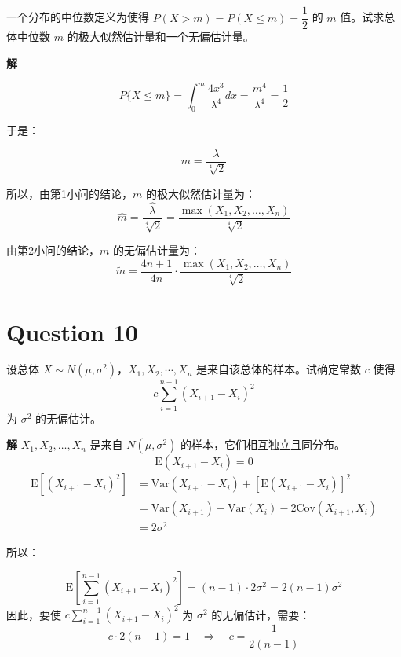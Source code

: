 \documentclass[12pt,a4paper]{article}
\begin{document}
\subsection{}
一个分布的中位数定义为使得 $P(X>m)=P(X\le m)=\dfrac{1}{2}$ 的 $m$ 值。试求总体中位数 $m$ 的极大似然估计量和一个无偏估计量。

\begin{answerbox}
\textbf{解}  

  $$
  P\{X \leq m\} = \int_0^m \frac{4x^3}{\lambda^4} dx = \frac{m^4}{\lambda^4} = \frac{1}{2}
  $$

  于是：

  $$
  m = \frac{\lambda}{\sqrt[4]{2}} 
  $$

  所以，由第1小问的结论，$m$ 的极大似然估计量为：
  $$\hat{m} = \frac{\hat{\lambda}}{\sqrt[4]{2}} = \frac{\max(X_1, X_2, \ldots, X_n)}{\sqrt[4]{2}}$$

  由第2小问的结论，$m$ 的无偏估计量为：
  $$
  \tilde{m} = \frac{4n+1}{4n} \cdot \frac{\max(X_1, X_2, \ldots, X_n)}{\sqrt[4]{2}}
  $$
\end{answerbox}

\section{Question 10}

设总体 $X\sim N(\mu,\sigma^2)$，$X_1,X_2,\cdots,X_n$ 是来自该总体的样本。试确定常数 $c$ 使得
\[
    c\sum_{i=1}^{n-1}(X_{i+1}-X_i)^2
\]
为 $\sigma^2$ 的无偏估计。

\begin{answerbox}
\textbf{解}  
  $X_1, X_2, \ldots, X_n$ 是来自 $N(\mu, \sigma^2)$ 的样本，它们相互独立且同分布。
  $$
  \mathrm{E}(X_{i+1}-X_i) = 0
  $$
  $$
  \begin{aligned}
  \mathrm{E}[(X_{i+1}-X_i)^2] &= \mathrm{Var}(X_{i+1}-X_i) + [\mathrm{E}(X_{i+1}-X_i)]^2 \\
  &= \mathrm{Var}(X_{i+1}) + \mathrm{Var}(X_i) - 2\mathrm{Cov}(X_{i+1}, X_i) \\
  &= 2\sigma^2
  \end{aligned}
  $$

  所以：

  $$
  \mathrm{E}\left[\sum_{i=1}^{n-1}(X_{i+1}-X_i)^2\right] = (n-1) \cdot 2\sigma^2 = 2(n-1)\sigma^2
  $$
  因此，要使 $c\sum_{i=1}^{n-1}(X_{i+1}-X_i)^2$ 为 $\sigma^2$ 的无偏估计，需要：
  $$
  c \cdot 2(n-1) = 1 \quad \Rightarrow \quad c = \frac{1}{2(n-1)}
  $$
\end{answerbox}
\end{document}

